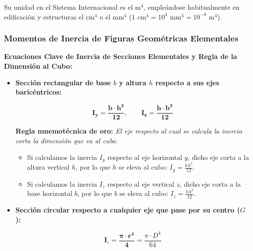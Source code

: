 Su unidad en el Sistema Internacional es el $\text{m}^4$, empleándose habitualmente en edificación y estructuras el $\text{cm}^4$ o el $\text{mm}^4$ ($1\text{ cm}^4 = 10^4\text{ mm}^4 = 10^{-8}\text{ m}^4$).



\subsubsection{Momentos de Inercia de Figuras Geométricas Elementales}



\begin{ImportanteBox}

    \textbf{Ecuaciones Clave de Inercia de Secciones Elementales y Regla de la Dimensión al Cubo:}

    \begin{itemize}

        \item \textbf{Sección rectangular de base $b$ y altura $h$ respecto a sus ejes baricéntricos:}

              \begin{equation}
                  \mathbf{I_y = \frac{b \cdot h^3}{12}}, \qquad \mathbf{I_z = \frac{h \cdot b^3}{12}}
\end{equation}

              \textbf{Regla mnemotécnica de oro:} \textit{El eje respecto al cual se calcula la inercia corta la dimensión que va al cubo}.

              \begin{itemize}

                  \item Si calculamos la inercia $I_y$ respecto al eje horizontal $y$, dicho eje corta a la altura vertical $h$, por lo que $h$ se eleva al cubo: $I_y = \frac{b\,h^3}{12}$.

                  \item Si calculamos la inercia $I_z$ respecto al eje vertical $z$, dicho eje corta a la base horizontal $b$, por lo que $b$ se eleva al cubo: $I_z = \frac{h\,b^3}{12}$.

              \end{itemize}

        \item \textbf{Sección circular respecto a cualquier eje que pase por su centro ($G$):}

              \begin{equation}
                  \mathbf{I_{\circ} = \frac{\pi \cdot r^4}{4}} = \frac{\pi \cdot D^4}{64}
\end{equation}


\end{itemize}
\end{ImportanteBox}
